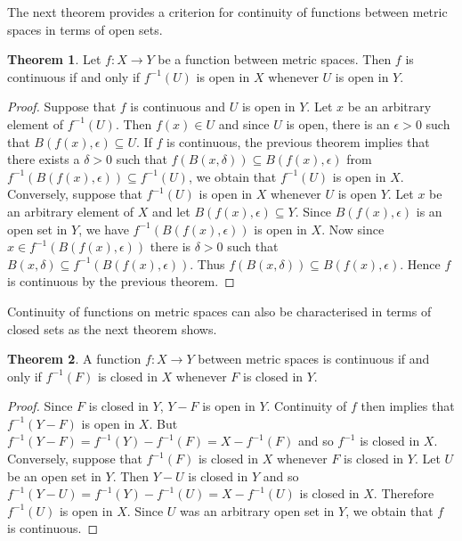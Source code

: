 \documentclass[11pt,a4paper]{article}
\theoremstyle{definition}
\newtheorem{thm}{Theorem}[subsection]
\begin{document}
The next theorem provides a criterion for continuity of functions between metric spaces in terms of open sets.



\begin{thm}
Let $f:X\rightarrow Y$ be a function between metric spaces. Then $f$ is continuous if and only if $f^{-1}(U)$ is open in $X$ whenever $U$ is open in $Y$.
\end{thm}

\begin{proof}
Suppose that $f$ is continuous and $U$ is open in $Y$. Let $x$ be an arbitrary element of $f^{-1}(U)$. Then $f(x)\in U$ and since $U$ is open, there is an $\epsilon >0$ such that $B(f(x),\epsilon)\subseteq U$. If $f$ is continuous, the previous theorem implies that there exists a $\delta >0$ such that $f(B(x,\delta))\subseteq B(f(x),\epsilon)$ from $f^{-1}(B(f(x),\epsilon))\subseteq f^{-1}(U)$, we obtain that $f^{-1}(U)$ is open in $X$.\\
Conversely, suppose that $f^{-1}(U)$ is open in $X$ whenever $U$ is open $Y$. Let $x$ be an arbitrary element of $X$ and let $B(f(x),\epsilon)\subseteq Y$. Since $B(f(x),\epsilon)$ is an open set in $Y$, we have $f^{-1}(B(f(x),\epsilon))$ is open in $X$. Now since $x\in f^{-1}(B(f(x),\epsilon))$ there is $\delta >0$ such that $B(x,\delta)\subseteq f^{-1}(B(f(x),\epsilon))$. Thus $f(B(x,\delta))\subseteq B(f(x),\epsilon)$. Hence $f$ is continuous by the previous theorem.
\end{proof}

Continuity of functions on  metric spaces can also be characterised in terms of closed sets as the next theorem shows.


\begin{thm}
A function $f:X\rightarrow Y$ between metric spaces is continuous if and only if $f^{-1} (F)$ is closed in $X$ whenever $F$ is closed in $Y$.
\end{thm}

\begin{proof}
Since $F$ is closed in $Y$, $Y-F$ is open in $Y$. Continuity of $f$ then implies that $f^{-1}(Y-F)$ is open in $X$. But $f^{-1}(Y-F)=f^{-1}(Y)-f^{-1}(F)=X-f^{-1}(F)$ and so $f^{-1}$ is closed in $X$.\\ 
Conversely, suppose that $f^{-1}(F)$ is closed in $X$ whenever $F$ is closed in $Y$. Let $U$ be an open set in $Y$. Then $Y-U$ is closed in $Y$ and so $f^{-1}(Y-U)=f^{-1}(Y)-f^{-1}(U)=X-f^{-1}(U)$ is closed in $X$. Therefore $f^{-1}(U)$ is open in $X$. Since $U$ was an arbitrary open set in $Y$, we obtain that $f$ is continuous.
\end{proof}
\end{document}
